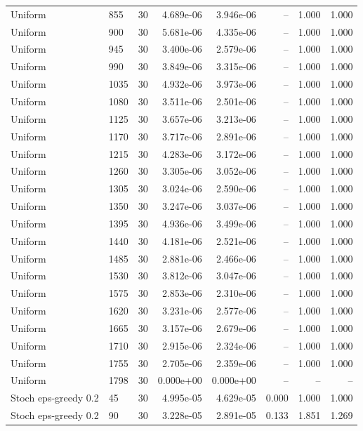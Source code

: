 \begin{scriptsize}
\begin{longtable}{llrrrrrr}
Uniform & 855 & 30 & 4.689e-06 & 3.946e-06 & -- & 1.000 & 1.000 \\
Uniform & 900 & 30 & 5.681e-06 & 4.335e-06 & -- & 1.000 & 1.000 \\
Uniform & 945 & 30 & 3.400e-06 & 2.579e-06 & -- & 1.000 & 1.000 \\
Uniform & 990 & 30 & 3.849e-06 & 3.315e-06 & -- & 1.000 & 1.000 \\
Uniform & 1035 & 30 & 4.932e-06 & 3.973e-06 & -- & 1.000 & 1.000 \\
Uniform & 1080 & 30 & 3.511e-06 & 2.501e-06 & -- & 1.000 & 1.000 \\
Uniform & 1125 & 30 & 3.657e-06 & 3.213e-06 & -- & 1.000 & 1.000 \\
Uniform & 1170 & 30 & 3.717e-06 & 2.891e-06 & -- & 1.000 & 1.000 \\
Uniform & 1215 & 30 & 4.283e-06 & 3.172e-06 & -- & 1.000 & 1.000 \\
Uniform & 1260 & 30 & 3.305e-06 & 3.052e-06 & -- & 1.000 & 1.000 \\
Uniform & 1305 & 30 & 3.024e-06 & 2.590e-06 & -- & 1.000 & 1.000 \\
Uniform & 1350 & 30 & 3.247e-06 & 3.037e-06 & -- & 1.000 & 1.000 \\
Uniform & 1395 & 30 & 4.936e-06 & 3.499e-06 & -- & 1.000 & 1.000 \\
Uniform & 1440 & 30 & 4.181e-06 & 2.521e-06 & -- & 1.000 & 1.000 \\
Uniform & 1485 & 30 & 2.881e-06 & 2.466e-06 & -- & 1.000 & 1.000 \\
Uniform & 1530 & 30 & 3.812e-06 & 3.047e-06 & -- & 1.000 & 1.000 \\
Uniform & 1575 & 30 & 2.853e-06 & 2.310e-06 & -- & 1.000 & 1.000 \\
Uniform & 1620 & 30 & 3.231e-06 & 2.577e-06 & -- & 1.000 & 1.000 \\
Uniform & 1665 & 30 & 3.157e-06 & 2.679e-06 & -- & 1.000 & 1.000 \\
Uniform & 1710 & 30 & 2.915e-06 & 2.324e-06 & -- & 1.000 & 1.000 \\
Uniform & 1755 & 30 & 2.705e-06 & 2.359e-06 & -- & 1.000 & 1.000 \\
Uniform & 1798 & 30 & 0.000e+00 & 0.000e+00 & -- & -- & -- \\
Stoch eps-greedy 0.2 & 45 & 30 & 4.995e-05 & 4.629e-05 & 0.000 & 1.000 & 1.000 \\
Stoch eps-greedy 0.2 & 90 & 30 & 3.228e-05 & 2.891e-05 & 0.133 & 1.851 & 1.269 \\

\end{longtable}
\end{scriptsize}
